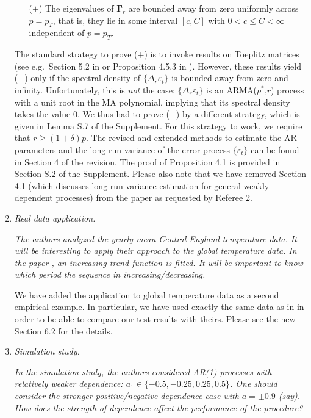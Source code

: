 \documentclass[a4paper,12pt]{article}
\begin{document}
\begin{enumerate}[label=(\arabic*),leftmargin=0.7cm]
\begin{itemize}[leftmargin=0.8cm]
\item[($+$)] The eigenvalues of $\boldsymbol{\Gamma}_r$ are bounded away from zero uniformly across $p=p_T$, that is, they lie in some interval $[c,C]$ with $0 < c \le C < \infty$ independent of $p=p_T$. 
\end{itemize}
The standard strategy to prove ($+$) is to invoke results on Toeplitz matrices (see e.g.\ Section 5.2 in \cite{GrenanderSzego1958} or Proposition 4.5.3 in \cite{BrockwellDavis1991}). However, these results yield ($+$) only if the spectral density of $\{\Delta_r \varepsilon_t\}$ is bounded away from zero and infinity. Unfortunately, this is \textit{not} the case: $\{\Delta_r \varepsilon_t\}$ is an ARMA($p^*$,$r$) process with a unit root in the MA polynomial, implying that its spectral density takes the value $0$. We thus had to prove ($+$) by a different strategy, which is given in Lemma S.7 of the Supplement. For this strategy to work, we require that $r \ge (1+\delta) p$. \newline
%
The revised and extended methods to estimate the AR parameters and the long-run variance of the error process $\{\varepsilon_t\}$ can be found in Section 4 of the revision. The proof of Proposition 4.1 is provided in Section S.2 of the Supplement. Please also note that we have removed Section 4.1 (which discusses long-run variance estimation for general weakly dependent processes) from the paper as requested by Referee 2. 


\item \textit{Real data application.}

\textit{The authors analyzed the yearly mean Central England temperature data. It will be interesting to apply their approach to the global temperature data. In the paper \cite{WuWoodroofeMentz2001}, an increasing trend function is fitted. It will be important to know which period the sequence in increasing/decreasing.}

We have added the application to global temperature data as a second empirical example. In particular, we have used exactly the same data as in \cite{WuWoodroofeMentz2001} in order to be able to compare our test results with theirs. Please see the new Section 6.2 for the details.


\item \textit{Simulation study.}

\textit{In the simulation study, the authors considered AR(1) processes with relatively weaker dependence: $a_1 \in \{-0.5, -0.25, 0.25, 0.5\}$. One should consider the \linebreak stronger positive/negative dependence case with $a = \pm 0.9$ (say). How does the strength of dependence affect the performance of the procedure?}


\end{enumerate}
\end{document}
